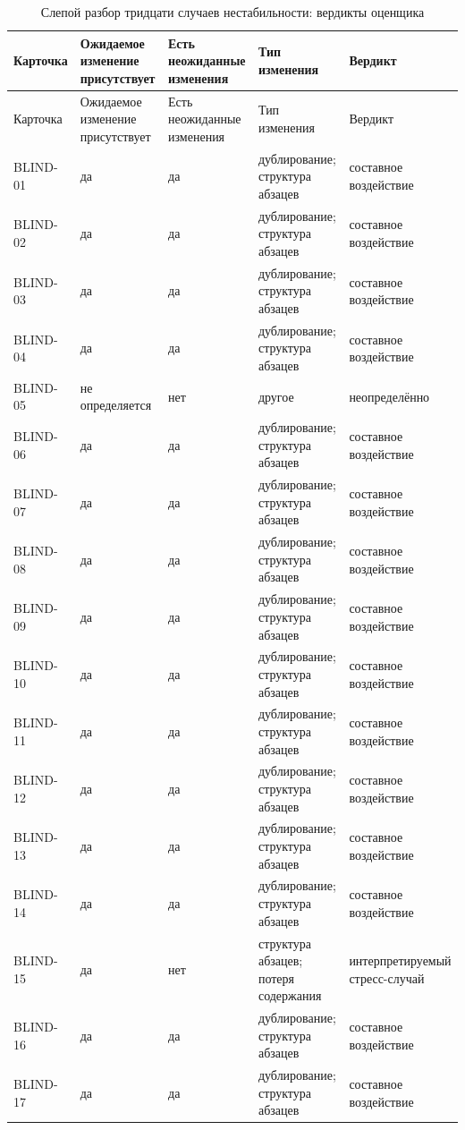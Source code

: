 \begingroup\scriptsize
\begin{longtable}{lp{2.5cm}p{2.5cm}p{3.3cm}p{3.1cm}}
\caption{Слепой разбор тридцати случаев нестабильности: вердикты оценщика}\label{tab:s10} \\
\toprule
Карточка & Ожидаемое изменение присутствует & Есть неожиданные изменения & Тип изменения & Вердикт \\
\midrule
\endfirsthead
\toprule
Карточка & Ожидаемое изменение присутствует & Есть неожиданные изменения & Тип изменения & Вердикт \\
\midrule
\endhead
\bottomrule
\endfoot
BLIND-01 & да & да & дублирование; структура абзацев & составное воздействие \\
BLIND-02 & да & да & дублирование; структура абзацев & составное воздействие \\
BLIND-03 & да & да & дублирование; структура абзацев & составное воздействие \\
BLIND-04 & да & да & дублирование; структура абзацев & составное воздействие \\
BLIND-05 & не определяется & нет & другое & неопределённо \\
BLIND-06 & да & да & дублирование; структура абзацев & составное воздействие \\
BLIND-07 & да & да & дублирование; структура абзацев & составное воздействие \\
BLIND-08 & да & да & дублирование; структура абзацев & составное воздействие \\
BLIND-09 & да & да & дублирование; структура абзацев & составное воздействие \\
BLIND-10 & да & да & дублирование; структура абзацев & составное воздействие \\
BLIND-11 & да & да & дублирование; структура абзацев & составное воздействие \\
BLIND-12 & да & да & дублирование; структура абзацев & составное воздействие \\
BLIND-13 & да & да & дублирование; структура абзацев & составное воздействие \\
BLIND-14 & да & да & дублирование; структура абзацев & составное воздействие \\
BLIND-15 & да & нет & структура абзацев; потеря содержания & интерпретируемый стресс-случай \\
BLIND-16 & да & да & дублирование; структура абзацев & составное воздействие \\
BLIND-17 & да & да & дублирование; структура абзацев & составное воздействие \\

\end{longtable}
